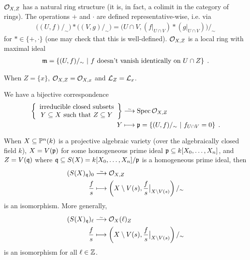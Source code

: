 \documentclass[a4paper,parskip=half,numbers=enddot, DIV=12]{scrreprt}
\begin{document}
    $\mathcal{O}_{X,Z}$ has a natural ring structure (it is, in fact, a colimit in the category of rings). The operations $+$ and $\cdot$ are defined representative-wise, i.e. via 
    \begin{align*}
        \big((U,f)/_\sim\big) * \big((V,g)/_\sim\big) = \big(U\cap V, (f|_{U\cap V})* (g|_{U\cap V})\big)/_\sim
    \end{align*}
    for $*\in\{+,\cdot\}$ (one may check that this is well-defined). $\mathcal{O}_{X,Z}$ is a local ring with maximal ideal
    \begin{align*}
        \mathfrak{m} = \left\{(U,f)/_\sim \ \middle|\  f\text{ doesn't vanish identically on }U\cap Z\right\}\;.
    \end{align*}
\begin{prop}
    \begin{alphanumerate}
    \item {}
        When $Z=\{x\}$, $\mathcal{O}_{X,Z} = \mathcal{O}_{X,x}$ and $\mathcal{L}_Z = \mathcal{L}_x$.
    \item   
	    We have a bijective correspondence
        \begin{align*}
	        \left\{
	        \begin{array}{c}
		        \text{irreducible closed subsets}\\
		        Y\subseteq X\text{ such that }Z\subseteq Y
	        \end{array}\right\}&\isomorphism\Spec \Oo_{X,Z}\\
            Y&\longmapsto \pp = \left\{(U,f)/_\sim\st f_{U\cap V} = 0\right\}\;.
        \end{align*}
    \item 
        When $X\subseteq \mathbb{P}^n(k)$ is a projective algebraic variety (over the algebraically closed field $k$), $X=V(\mathfrak{p})$ for some homogeneous prime ideal $\mathfrak{p}\subseteq k[X_0,\ldots,X_n]$, and $Z= V(\mathfrak{q})$ where $\mathfrak{q}\subseteq S(X) = k[X_0,\ldots, X_n]/\mathfrak{p}$ is a homogeneous prime ideal, then
        \begin{align*}
            (S(X)_\qq)_0 &\isomorphism \Oo_{X,Z}\\
            \frac{f}{s} &\longmapsto \left(X\setminus V(s) , \frac{f}{s}\big|_{X\setminus V(s)}\right)/_\sim
           \end{align*}
           is an isomorphism. More generally,
           \begin{align*}
            (S(X)_\qq)_\ell &\isomorphism \Oo_X(\ell)_Z\\
            \frac{f}{s} &\longmapsto \left(X\setminus V(s) , \frac{f}{s}\big|_{X\setminus V(s)}\right)/_\sim
        \end{align*}
        is an isomorphism for all $\ell\in \mathbb{Z}$.
    \end{alphanumerate}
\end{prop}
\end{document}
